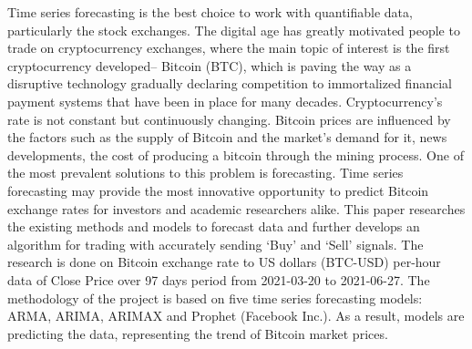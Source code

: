 
Time series forecasting is the best choice to work with quantifiable data, particularly the stock exchanges. The digital age has greatly motivated people to trade on cryptocurrency exchanges, where the main topic of interest is the first cryptocurrency developed– Bitcoin (BTC), which is paving the way as a disruptive technology gradually declaring competition to immortalized financial payment systems that have been in place for many decades. Cryptocurrency’s rate is not constant but continuously changing. Bitcoin prices are influenced by the factors such as the supply of Bitcoin and the market’s demand for it, news developments, the cost of producing a bitcoin through the mining process. One of the most prevalent solutions to this problem is forecasting. Time series forecasting may provide the most innovative opportunity to predict Bitcoin exchange rates for investors and academic researchers alike. This paper researches the existing methods and models to forecast data and further develops an algorithm for trading with accurately sending ‘Buy’ and ‘Sell’ signals. The research is done on Bitcoin exchange rate to US dollars (BTC-USD) per-hour data of Close Price over 97 days period from 2021-03-20 to 2021-06-27. The methodology of the project is based on five time series forecasting models: ARMA, ARIMA, ARIMAX and Prophet (Facebook Inc.). As a result, models are predicting the data, representing the trend of Bitcoin market prices.

 